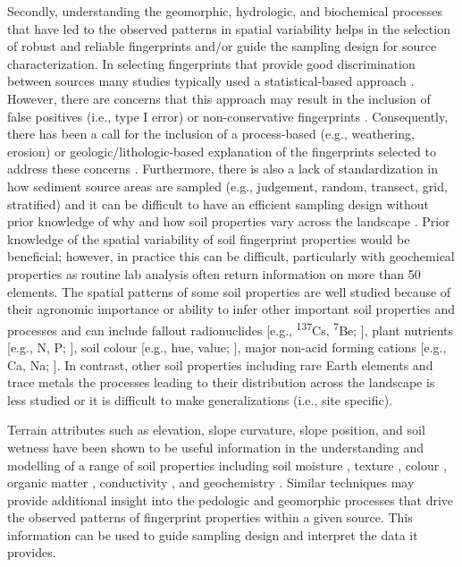 \documentclass[
  number]{elsarticle}
\begin{document}
Secondly, understanding the geomorphic, hydrologic, and biochemical
processes that have led to the observed patterns in spatial variability
helps in the selection of robust and reliable fingerprints and/or guide
the sampling design for source characterization. In selecting
fingerprints that provide good discrimination between sources many
studies typically used a statistical-based approach \citep{collins1997}.
However, there are concerns that this approach may result in the
inclusion of false positives (i.e., type I error) or non-conservative
fingerprints \citep{koiter2013}. Consequently, there has been a call for
the inclusion of a process-based (e.g., weathering, erosion) or
geologic/lithologic-based explanation of the fingerprints selected to
address these concerns \citep{collins2020}. Furthermore, there is also a
lack of standardization in how sediment source areas are sampled (e.g.,
judgement, random, transect, grid, stratified) and it can be difficult
to have an efficient sampling design without prior knowledge of why and
how soil properties vary across the landscape \citep{lunamiño2024}.
Prior knowledge of the spatial variability of soil fingerprint
properties would be beneficial; however, in practice this can be
difficult, particularly with geochemical properties as routine lab
analysis often return information on more than 50 elements. The spatial
patterns of some soil properties are well studied because of their
agronomic importance or ability to infer other important soil properties
and processes and can include fallout radionuclides {[}e.g.,
\textsuperscript{137}Cs, \textsuperscript{7}Be; \citep{ritchie1970}{]},
plant nutrients {[}e.g., N, P; \citep{vasu2017}{]}, soil colour {[}e.g.,
hue, value; \citep{viscarrarossel2006}{]}, major non-acid forming
cations {[}e.g., Ca, Na; \citep{sun2021}{]}. In contrast, other soil
properties including rare Earth elements and trace metals the processes
leading to their distribution across the landscape is less studied or it
is difficult to make generalizations (i.e., site specific).

Terrain attributes such as elevation, slope curvature, slope position,
and soil wetness have been shown to be useful information in the
understanding and modelling of a range of soil properties including soil
moisture \citep{beaudette2013}, texture \citep{kokulan2018}, colour
\citep{brown2004}, organic matter \citep{zhang2012}, conductivity
\citep{umali2012}, and geochemistry \citep{lima2023}. Similar techniques
may provide additional insight into the pedologic and geomorphic
processes that drive the observed patterns of fingerprint properties
within a given source. This information can be used to guide sampling
design and interpret the data it provides.
\end{document}
